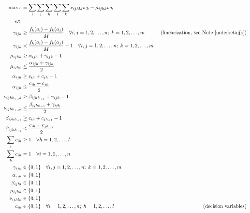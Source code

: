 \documentclass[a4paper]{article}
\begin{document}
    \begin{align}
    	\max z &= \sum_i \sum_j \sum_h \sum_l \sum_k \nu_{ijhlk} w_k - \mu_{ijhk} w_k \\
        \text{s.t.} & \\
        \gamma_{ijk} &\geq \frac{f_k(a_i)-f_k(a_j)}{M} \quad \forall i,j = 1, 2, \dots, n;\; k = 1, 2, \dots, m & \text{ (linearization, see Note \ref{note:betaijk})} \\
        \gamma_{ijk} &< \frac{f_k(a_i)-f_k(a_j)}{M} + 1 \quad \forall i,j = 1, 2, \dots, n;\; k = 1, 2, \dots, m \\
        \mu_{ijhk}  &\geq \alpha_{ijh} + \gamma_{ijk} - 1 \\
        \mu_{ijhk} &\leq \frac{\alpha_{ijh} + \gamma_{ijk}}{2} \\
        \alpha_{ijh} &\geq c_{ih} + c_{jh} - 1\\
        \alpha_{ijh} &\leq \frac{c_{ih} + c_{jh}}{2} \\
        \nu_{ijhh_{+1}k}  &\geq \beta_{ijhh_{+1}} + \gamma_{ijk} - 1 \\
        \nu_{ijhh_{+1}k} &\leq \frac{\beta_{ijhh_{+1}} + \gamma_{ijk}}{2} \\
        \beta_{ijhh_{+1}} &\geq c_{ih} + c_{jh_{+1}} - 1\\
        \beta_{ijhh_{+1}} &\leq \frac{c_{ih} + c_{jh_{+1}}}{2} \\
        \sum_i c_{ih} &\geq 1 \quad \forall h = 1,2, \dots, l \\
        \sum_h c_{ih} &= 1 \quad \forall i = 1,2, \dots, n \\
        \gamma_{ijk} &\in \{0,1\} \quad \forall i,j = 1, 2, \dots, n;\; k = 1, 2, \dots, m \\
        \alpha_{ijh} &\in \{0,1\} \\
        \beta_{ijhl} &\in \{0,1\} \\
        \mu_{ijhk} &\in \{0,1\} \\
        \nu_{ijhlk} &\in \{0,1\} \\
        c_{ih} &\in \{0, 1\} \quad \forall i = 1, 2, \dots, n;\; h = 1, 2, \dots, l & \text{ (decision variables)}
    \end{align}
\end{document}
